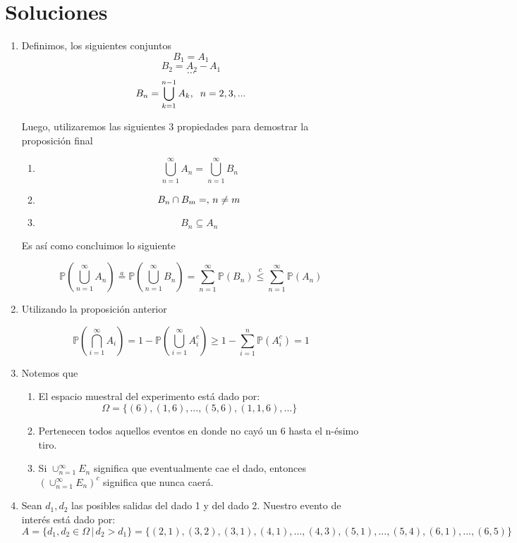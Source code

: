 \section*{Soluciones}
\begin{enumerate}
\item Definimos, los siguientes conjuntos
\[ B_1 = A_1 \]
\[ B_2 = A_2 - A_1\]
\[ ... \]
\[ B_n = \bigcup_{k=1}^{n-1} A_k, \hspace{0.2cm} n =2,3,...\]

Luego, utilizaremos las siguientes 3 propiedades para demostrar la proposición final

\begin{enumerate}
	\item \[ \bigcup_{n=1}^\infty A_n = \bigcup_{n=1}^\infty B_n\]
	\item \[ B_n \cap B_m = \empty, \, n \neq m\]
	\item \[ B_n \subseteq A_n\]
\end{enumerate}

Es así como concluimos lo siguiente

\[ \mathbb{P}(\bigcup_{n=1}^\infty A_n) \overset{a}{=} \mathbb{P}(\bigcup_{n=1}^\infty B_n) = \sum_{n=1}^\infty \mathbb{P}(B_n) \overset{c}{\le} \sum_{n=1}^\infty \mathbb{P}(A_n)\]

\item Utilizando la proposición anterior

\[ \mathbb{P}(\bigcap_{i=1}^\infty A_i) = 1- \mathbb{P}(\bigcup_{i=1}^\infty A_i^c) \ge 1- \sum_{i=1}^n \mathbb{P}(A_i^c) = 1\]

\item Notemos que 
\begin{enumerate}
	\item El espacio muestral del experimento está dado por:
	\[ \Omega = \{ (6), (1,6),...,(5,6),(1,1,6),...\}\]
	
	\item Pertenecen todos aquellos eventos en donde no cayó un 6 hasta el n-ésimo tiro.
	
	\item Si $\cup_{n=1}^\infty E_n$ significa que eventualmente cae el dado, entonces $(\cup_{n=1}^\infty E_n)^c$ significa que nunca caerá.
\end{enumerate}

\item Sean $d_1,d_2$ las posibles salidas del dado 1 y del dado 2. Nuestro evento de interés está dado por: \[ A = \{d_1,d_2 \in \Omega \,|\, d_2 > d_1 \} = \{(2,1),(3,2),(3,1),(4,1),...,(4,3),(5,1),...,(5,4),(6,1),...,(6,5)\} \]


\end{enumerate}
